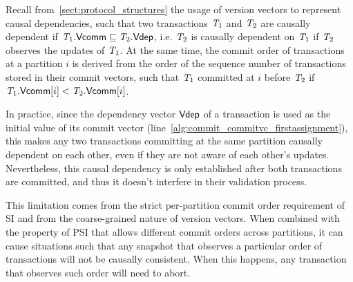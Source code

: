 Recall from~\ref{sect:protocol_structures} the usage of version vectors to represent causal dependencies, such that two transactions $\mathit{T}_1$ and $\mathit{T}_2$ are causally dependent if $\mathit{T}_1.\mathsf{Vcomm} \sqsubseteq \mathit{T}_2.\mathsf{Vdep}$, i.e. $\mathit{T}_2$ is causally dependent on $\mathit{T}_1$ if $\mathit{T}_2$ observes the updates of $\mathit{T}_1$. At the same time, the commit order of transactions at a partition $i$ is derived from the order of the sequence number of transactions stored in their commit vectors, such that $\mathit{T}_1$ committed at $i$ before $\mathit{T}_2$ if $\mathit{T}_1.\mathsf{Vcomm}[i] < \mathit{T}_2.\mathsf{Vcomm}[i]$.

In practice, since the dependency vector $\mathsf{Vdep}$ of a transaction is used as the initial value of its commit vector (line~\ref{alg:commit_commitvc_firstassignment}), this makes any two transactions committing at the same partition causally dependent on each other, even if they are not aware of each other's updates. Nevertheless, this causal dependency is only established after both transactions are committed, and thus it doesn't interfere in their validation process.


This limitation comes from the strict per-partition commit order requirement of SI and from the coarse-grained nature of version vectors. When combined with the property of PSI that allows different commit orders across partitions, it can cause situations such that any snapshot that observes a particular order of transactions will not be causally consistent. When this happens, any transaction that observes such order will need to abort.

